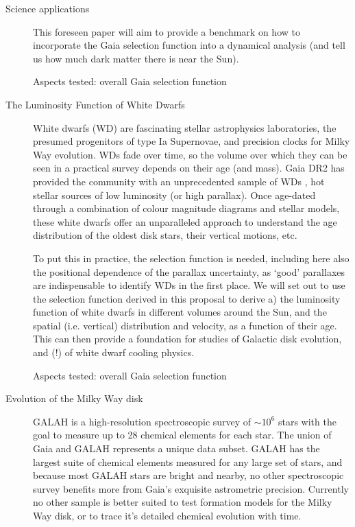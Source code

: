 \begin{workpackage}{Science applications}
\begin{wpobjectives}
\begin{description}
{        This foreseen paper will aim  to provide a benchmark on how to incorporate the Gaia selection function into a dynamical analysis (and tell us how much dark matter there is near the Sun).
        
        \textsf{Aspects tested: overall Gaia selection function}    
    }
      
    \item[The Luminosity Function of White Dwarfs]{
        White dwarfs (WD) are fascinating stellar astrophysics laboratories, the presumed progenitors of type Ia Supernovae, and precision clocks for Milky Way evolution. WDs fade over time, so the volume over which they can be seen in a practical survey depends on their age (and mass). Gaia DR2 has provided the community with an unprecedented sample of WDs \citep{WD_DR2}, hot stellar sources of low luminosity (or high parallax). Once age-dated through a combination of colour magnitude diagrams and stellar models, these white dwarfs offer an unparalleled approach to understand the age distribution of the oldest disk stars, their vertical motions, etc.
      
        To put this in practice, the selection function is needed, including here also the positional dependence of the parallax uncertainty, as `good' parallaxes are indispensable to identify WDs in the first place. We will set out to use the selection function derived in this proposal to derive a) the luminosity function of white dwarfs in different volumes around the Sun, and the spatial (i.e. vertical) distribution and velocity, as a function of their age. This can then provide a foundation for studies of Galactic disk evolution, and (!) of white dwarf cooling physics.
        
        \textsf{Aspects tested: overall Gaia selection function}
    }
      
     \item[Evolution of the Milky Way disk]
        {GALAH is a high-resolution spectroscopic survey of $\sim10^6$ stars with the goal to measure up to 28 chemical elements for each star. The union of Gaia and GALAH represents a unique data subset. GALAH has the largest suite of chemical elements measured for any large set of stars, and because most GALAH stars are bright and nearby, no other spectroscopic survey benefits more from Gaia's exquisite astrometric precision. Currently no other sample is better suited to test formation models for the Milky Way disk, or to trace it's detailed chemical evolution with time.
      
}
\end{description}
\end{wpobjectives}
\end{workpackage}
